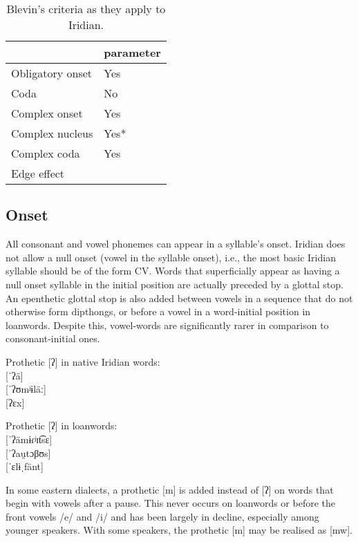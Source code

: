 \begin{table}[h!]
	\small
	\caption{Blevin's criteria as they apply to Iridian.}
	\medskip
	\begin{tabularx}{0.6\textwidth}{@{}YM@{}}
		\toprule
		& {\sc parameter}\\
		\midrule
		Obligatory onset & Yes\\
		Coda & No\\
		Complex onset & Yes\\
		Complex nucleus & Yes*\\
		Complex coda & Yes\\
		Edge effect & \\
		\bottomrule
	\end{tabularx}
\end{table}


\subsection{Onset}

\par All consonant and vowel phonemes can appear in a syllable's onset. Iridian does not allow a null onset (vowel in the syllable onset), i.e., the most basic Iridian syllable should be of the form CV. Words that superficially appear as having a null onset syllable in the initial position are actually preceded by a glottal stop. An epenthetic glottal stop is also added between vowels in a sequence that do not otherwise form dipthongs, or before a vowel in a word-initial position in loanwords. Despite this, vowel-words are significantly rarer in comparison to consonant-initial ones.

\ex
Prothetic [ʔ] in native Iridian words:\\
 [ˈʔä]\\
 [ˈʔʊmʲɨläː]\\
 [ʔɛx]
\xe

\ex
Prothetic [ʔ] in loanwords:\\
 [ˈʔämɨɾʲɪt͡sɛ]\\
 [ˈʔau̯tɔβʊs] \\
 [ˈɛlɨˌfänt]
\xe

In some eastern dialects, a prothetic [m] is added instead of [ʔ] on words that begin with vowels after a pause. This never occurs on loanwords or before the front vowels /e/ and /i/ and has been largely in decline, especially among younger speakers. With some speakers, the prothetic [m] may be realised as [mw].

